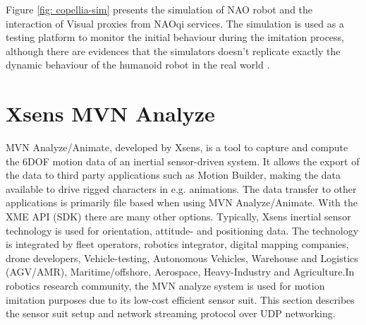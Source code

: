 Figure \ref{fig: copellia-sim} presents the simulation of NAO robot and the interaction of Visual proxies from NAOqi services. The simulation is 
used as a testing platform to monitor the initial behaviour during the imitation process, although there are evidences that the simulators doesn't replicate exactly the dynamic 
behaviour of the humanoid robot in the real world \cite{ramosponce}. 

\section{Xsens MVN Analyze}

MVN Analyze/Animate, developed by Xsens, is a tool to capture and compute the 6DOF motion data of an inertial sensor-driven system. It allows the export of the data to third party 
applications such as Motion Builder, making the data available to drive rigged characters in e.g. animations. The data transfer to other applications is primarily file based when using MVN Analyze/Animate. With the XME API (SDK) there are many other options.
Typically, Xsens inertial sensor technology is used for orientation, attitude- and positioning data. The technology is integrated by fleet operators, robotics integrator, digital mapping companies, drone developers, Vehicle-testing, Autonomous Vehicles, Warehouse 
and Logistics (AGV/AMR), Maritime/offshore, Aerospace, Heavy-Industry and Agriculture.In robotics research community, the MVN analyze system is used for motion imitation purposes due to its low-cost efficient sensor suit. This section describes the sensor suit setup and 
network streaming protocol over UDP networking.

